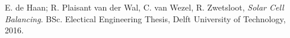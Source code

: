 \documentclass[a4paper,journal]{DDREAM}
\begin{document}

%
%
%

\begin{thebibliography}{1}

E. de Haan; R. Plaisant van der Wal, C. van Wezel, R. Zwetsloot, \emph{Solar Cell Balancing}. BSc. Electical Engineering Thesis, Delft University of Technology, 2016.

\end{thebibliography}
\end{document}

